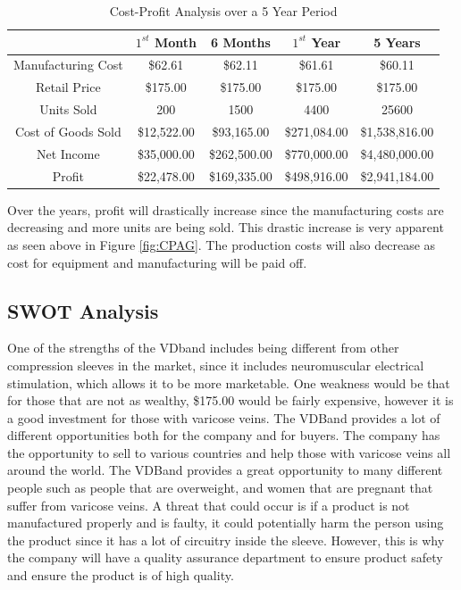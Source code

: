 \documentclass[11.5pt]{article}
\begin{document}
\begin{table}[H]
	\centering
	\caption{Cost-Profit Analysis over a 5 Year Period}
	\vspace{3mm}
	\begin{tabular}{ccccc}
	\hline
		 {\hspace{1em}} & $1^{st}$ Month & 6 Months & $1^{st}$ Year & 5 Years \\
	\hline
		Manufacturing Cost & \$62.61 & \$62.11 & \$61.61 & \$60.11 \\
		Retail Price  & \$175.00 & \$175.00 & \$175.00 & \$175.00\\
	    Units Sold  & 200 & 1500 & 4400 & 25600 \\
		Cost of Goods Sold & \$12,522.00 & \$93,165.00 & \$271,084.00 & \$1,538,816.00 \\
		Net Income & \$35,000.00 & \$262,500.00 & \$770,000.00 & \$4,480,000.00\\
	
	\hline
	    	Profit & \$22,478.00 & \$169,335.00 & \$498,916.00 & \$2,941,184.00\\
	 \hline 
		
	\end{tabular}
	\label{table:CPA}
\end{table}

Over the years, profit will drastically increase since the manufacturing costs are decreasing and more units are being sold. This drastic increase is very apparent as seen above in Figure \ref{fig:CPAG}. The production costs will also decrease as cost for equipment and manufacturing will be paid off.

\subsection{SWOT Analysis}
One of the strengths of the VDband includes being different from other compression sleeves in the market, since it includes neuromuscular electrical stimulation, which allows it to be more marketable. One weakness would be that for those that are not as wealthy, \$175.00 would be fairly expensive, however it is a good investment for those with varicose veins. The VDBand provides a lot of different opportunities both for the company and for buyers. The company has the opportunity to sell to various countries and help those with varicose veins all around the world. The VDBand provides a great opportunity to many different people such as people that are overweight, and women that are pregnant that suffer from varicose veins. A threat that could occur is if a product is not manufactured properly and is faulty, it could potentially harm the person using the product since it has a lot of circuitry inside the sleeve. However, this is why the company will have a quality assurance department to ensure product safety and ensure the product is of high quality. 
\end{document}
